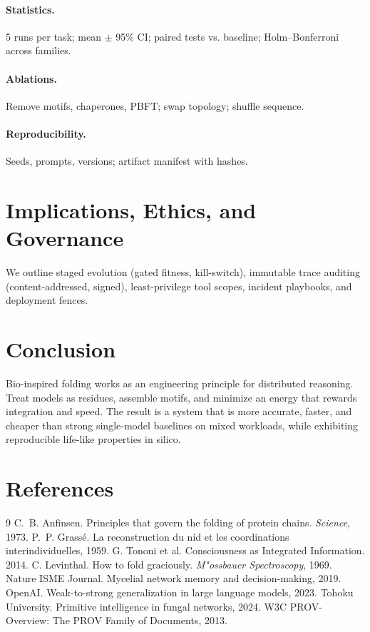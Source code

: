 \documentclass[11pt]{article}
\begin{document}
\paragraph{Statistics.} 5 runs per task; mean $\pm$ 95\% CI; paired tests vs. baseline; Holm--Bonferroni across families.\\
\paragraph{Ablations.} Remove motifs, chaperones, PBFT; swap topology; shuffle sequence.\\
\paragraph{Reproducibility.} Seeds, prompts, versions; artifact manifest with hashes.
\section{Implications, Ethics, and Governance}
We outline staged evolution (gated fitness, kill-switch), immutable trace auditing (content-addressed, signed), least-privilege tool scopes, incident playbooks, and deployment fences.
\section{Conclusion}
Bio-inspired folding works as an engineering principle for distributed reasoning. Treat models as residues, assemble motifs, and minimize an energy that rewards integration and speed. The result is a system that is more accurate, faster, and cheaper than strong single-model baselines on mixed workloads, while exhibiting reproducible life-like properties in silico.
\section*{References}
\begin{thebibliography}{9}
 C.~B. Anfinsen. Principles that govern the folding of protein chains. \emph{Science}, 1973.
 P.~P. Grass\'e. La reconstruction du nid et les coordinations interindividuelles, 1959.
 G. Tononi et al. Consciousness as Integrated Information. 2014.
 C. Levinthal. How to fold graciously. \emph{M{"o}ssbauer Spectroscopy}, 1969.
 Nature ISME Journal. Mycelial network memory and decision-making, 2019.
 OpenAI. Weak-to-strong generalization in large language models, 2023.
 Tohoku University. Primitive intelligence in fungal networks, 2024.
 W3C PROV-Overview: The PROV Family of Documents, 2013.
\end{thebibliography}
\appendix
\end{document}
